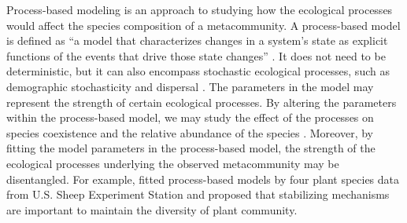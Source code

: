 Process-based modeling is an approach to studying how the ecological processes would affect the species composition of a metacommunity. A process-based model is defined as “a model that characterizes changes in a system's state as explicit functions of the events that drive those state changes” \citep{connolly2017process}. It does not need to be deterministic, but it can also encompass stochastic ecological processes, such as demographic stochasticity and dispersal \citep{connolly2017process}. The parameters in the model may represent the strength of certain ecological processes. By altering the parameters within the process-based model, we may study the effect of the processes on species coexistence \citep{adler2007niche, adler2010coexistence} and the relative abundance of the species \citep{ke2015soil}. Moreover, by fitting the model parameters in the process-based model, the strength of the ecological processes underlying the observed metacommunity may be disentangled. For example, \citet{adler2010coexistence} fitted process-based models by four plant species data from U.S. Sheep Experiment Station and proposed that stabilizing mechanisms are important to maintain the diversity of plant community.


